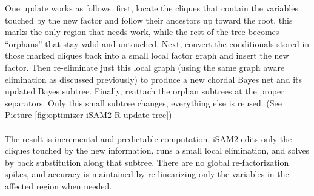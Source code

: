 \noindent
One update works as follows. first, locate the cliques that contain the variables touched by the new factor and follow their ancestors up toward the root, this marks the only region that needs work, while the rest of the tree becomes ``orphans'' that stay valid and untouched. Next, convert the conditionals stored in those marked cliques back into a small local factor graph and insert the new factor. Then re-eliminate just this local graph (using the same graph aware elimination as discussed previously) to produce a new chordal Bayes net and its updated Bayes subtree. Finally, reattach the orphan subtrees at the proper separators. Only this small subtree changes, everything else is reused. (See Picture \ref{fig:optimizer-iSAM2-R-update-tree})
\\ \\
The result is incremental and predictable computation. iSAM2 edits only the cliques touched by the new information, runs a small local elimination, and solves by back substitution along that subtree. There are no global re-factorization spikes, and accuracy is maintained by re-linearizing only the variables in the affected region when needed.



